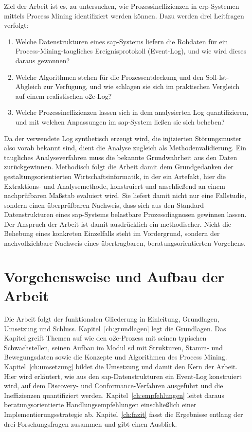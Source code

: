 Ziel der Arbeit ist es, zu untersuchen, wie Prozessineffizienzen in \gls{erp}-Systemen mittels Process Mining identifiziert werden können. Dazu werden drei Leitfragen verfolgt:
\begin{enumerate}
    \item Welche Datenstrukturen eines \gls{sap}-Systems liefern die Rohdaten für ein Process-Mining-taugliches Ereignisprotokoll (Event-Log), und wie wird dieses daraus gewonnen?
    \item Welche Algorithmen stehen für die Prozessentdeckung und den Soll-Ist-Abgleich zur Verfügung, und wie schlagen sie sich im praktischen Vergleich auf einem realistischen \gls{o2c}-Log?
    \item Welche Prozessineffizienzen lassen sich in dem analysierten Log quantifizieren, und mit welchen Anpassungen im \gls{sap}-System ließen sie sich beheben?
\end{enumerate}
Da der verwendete Log synthetisch erzeugt wird, die injizierten Störungsmuster also vorab bekannt sind, dient die Analyse zugleich als Methodenvalidierung. Ein taugliches Analyseverfahren muss die bekannte Grundwahrheit aus den Daten zurückgewinnen. Methodisch folgt die Arbeit damit dem Grundgedanken der gestaltungsorientierten Wirtschaftsinformatik, in der ein Artefakt, hier die Extraktions- und Analysemethode, konstruiert und anschließend an einem nachprüfbaren Maßstab evaluiert wird. Sie liefert damit nicht nur eine Fallstudie, sondern einen überprüfbaren Nachweis, dass sich aus den Standard-Datenstrukturen eines \gls{sap}-Systems belastbare Prozessdiagnosen gewinnen lassen. Der Anspruch der Arbeit ist damit ausdrücklich ein methodischer. Nicht die Behebung eines konkreten Einzelfalls steht im Vordergrund, sondern der nachvollziehbare Nachweis eines übertragbaren, beratungsorientierten Vorgehens.

\section{Vorgehensweise und Aufbau der Arbeit}\label{sec:vorgehensweise}

Die Arbeit folgt der funktionalen Gliederung in Einleitung, Grundlagen, Umsetzung und Schluss. Kapitel~\ref{ch:grundlagen} legt die Grundlagen. Das Kapitel greift Themen auf wie den \gls{o2c}-Prozess mit seinen typischen Schwachstellen, seinen Aufbau im Modul \gls{sd} mit Strukturen, Stamm- und Bewegungsdaten sowie die Konzepte und Algorithmen des Process Mining. Kapitel~\ref{ch:umsetzung} bildet die Umsetzung und damit den Kern der Arbeit. Hier wird erläutert, wie aus den \gls{sap}-Datenstrukturen ein Event-Log konstruiert wird, auf dem Discovery- und Conformance-Verfahren ausgeführt und die Ineffizienzen quantifiziert werden. Kapitel~\ref{ch:empfehlungen} leitet daraus beratungsorientierte Handlungsempfehlungen einschließlich einer Implementierungsstrategie ab. Kapitel~\ref{ch:fazit} fasst die Ergebnisse entlang der drei Forschungsfragen zusammen und gibt einen Ausblick.
